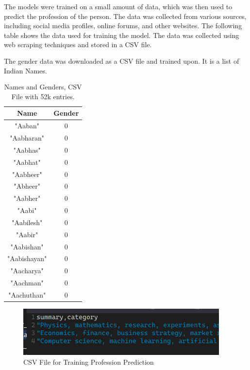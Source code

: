\documentclass[openany]{report}
\begin{document}
The models were trained on a small amount of data, which was then used to predict the profession of the person. The data was collected from various sources, including social media profiles, online forums, and other websites. The following table shows the data used for training the model. The data was collected using web scraping techniques and stored in a CSV file.

The gender data was downloaded as a CSV file and trained upon. It is a list of Indian Names.

\begin{table}[H]
    \centering
    \begin{tabular}{|c|c|}
        \hline
        \textbf{Name} & \textbf{Gender} \\
        \hline
        "Aaban"       & 0               \\
        "Aabharan"    & 0               \\
        "Aabhas"      & 0               \\
        "Aabhat"      & 0               \\
        "Aabheer"     & 0               \\
        "Abheer"      & 0               \\
        "Aabher"      & 0               \\
        "Aabi"        & 0               \\
        "Aabilesh"    & 0               \\
        "Aabir"       & 0               \\
        "Aabishan"    & 0               \\
        "Aabishayan"  & 0               \\
        "Aacharya"    & 0               \\
        "Aachman"     & 0               \\
        "Aachuthan"   & 0               \\
        \hline
    \end{tabular}
    \caption{Names and Genders, CSV File with 52k entries.}

    \label{tab:names}
\end{table}

\begin{figure}[H]
    \begin{small}
        \begin{center}
            \includegraphics[width=0.95\textwidth]{field training.png}
        \end{center}
        \caption{CSV File for Training Profession Prediction}
        \label{fig:Training Profession}
    \end{small}
\end{figure}
\end{document}
